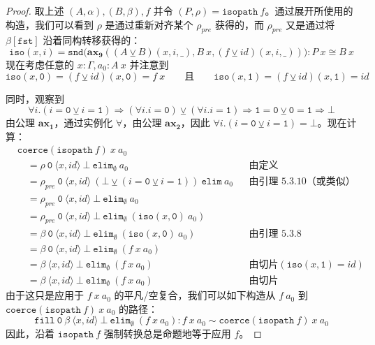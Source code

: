 \documentclass{ctexrep}
\theoremstyle{plain}
\theoremstyle{definition}
\theoremstyle{remark}
\newcommand{\ax}[1]{\mathbf{ax_{#1}}}
\begin{document}
\begin{proof}
取上述 $(A,\alpha), (B,\beta), f$ 并令 $(P,\rho) = \mathtt{isopath}\ f$。通过展开所使用的构造，我们可以看到 $\rho$ 是通过重新对齐某个 $\rho_{pre}$ 获得的，而 $\rho_{pre}$ 又是通过将 $\beta[\mathtt{fst}]$ 沿着同构转移获得的：
$$\mathtt{iso}(x,i) = \mathtt{snd}\big(\ax{9}((A \veebar B)(x,i,\_), B\ x, (f \veebar  id )(x,i,\_))\big) : P\ x \cong B\ x$$
现在考虑任意的 $x : \Gamma, a_0 : A\ x$ 并注意到
$$\mathtt{iso}(x,\mathtt{0}) = (f \veebar  id )(x,\mathtt{0}) = f\ x \qquad \text{且} \qquad \mathtt{iso}(x,\mathtt{1}) = (f \veebar  id )(x,\mathtt{1}) =  id $$

同时，观察到
$$\forall i.(i = \mathtt{0} \veebar i = \mathtt{1}) \Rightarrow (\forall i.i = \mathtt{0}) \veebar (\forall i.i = \mathtt{1}) \Rightarrow \mathtt{1} = \mathtt{0} \veebar \mathtt{0} = \mathtt{1} \Rightarrow \bot$$
由公理 $\ax{1}$，通过实例化 $\forall$，由公理 $\ax{2}$，因此 $\forall i.(i = \mathtt{0} \veebar i = \mathtt{1}) = \bot$。现在计算：
\begin{align*}
&\mathtt{coerce}(\mathtt{isopath}\ f)\ x\ a_0 \\
&\quad = \rho\ \mathtt{0}\ \langle x,  id  \rangle\ \bot\ \mathtt{elim}_{\emptyset}\ a_0 && \text{由定义} \\
&\quad = \rho_{pre}\ \mathtt{0}\ \langle x,  id  \rangle\ (\bot \veebar (i = \mathtt{0} \veebar i = \mathtt{1}))\ \mathtt{elim}\ a_0 && \text{由引理 5.3.10（或类似）} \\
&\quad = \rho_{pre}\ \mathtt{0}\ \langle x,  id  \rangle\ \bot\ \mathtt{elim}_{\emptyset}\ a_0 \\
&\quad = \rho_{pre}\ \mathtt{0}\ \langle x,  id  \rangle\ \bot\ \mathtt{elim}_{\emptyset}\ (\mathtt{iso}(x,\mathtt{0})\ a_0) \\
&\quad = \beta\ \mathtt{0}\ \langle x,  id  \rangle\ \bot\ \mathtt{elim}_{\emptyset}\ (\mathtt{iso}(x,\mathtt{0})\ a_0) && \text{由引理 5.3.8} \\
&\quad = \beta\ \mathtt{0}\ \langle x,  id  \rangle\ \bot\ \mathtt{elim}_{\emptyset}\ (f\ x\ a_0) \\
&\quad = \beta\ \langle x,  id  \rangle\ \bot\ \mathtt{elim}_{\emptyset}\ (f\ x\ a_0) && \text{由切片} (\mathtt{iso}(x,\mathtt{1}) =  id ) \\
&\quad = \beta\ \langle x,  id  \rangle\ \bot\ \mathtt{elim}_{\emptyset}\ (f\ x\ a_0) && \text{由切片}
\end{align*}
由于这只是应用于 $f\ x\ a_0$ 的平凡/空复合，我们可以如下构造从 $f\ a_0$ 到 $\mathtt{coerce}(\mathtt{isopath}\ f)\ x\ a_0$ 的路径：
$$\mathtt{fill}\ \mathtt{0}\ \beta\ \langle x,  id  \rangle\ \bot\ \mathtt{elim}_{\emptyset}\ (f\ x\ a_0) : f\ x\ a_0 \sim \mathtt{coerce}(\mathtt{isopath}\ f)\ x\ a_0$$
因此，沿着 $\mathtt{isopath}\ f$ 强制转换总是命题地等于应用 $f$。
\end{proof}
\end{document}
